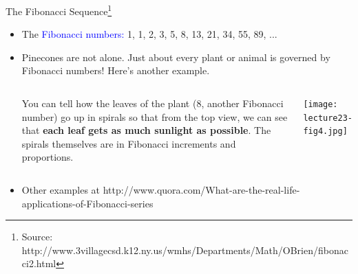 \documentclass[aspectratio=169]{beamer}
\providecommand{\Blue}[1]{\textcolor{blue}{#1}}
\begin{document}
\begin{frame}[plain]{The Fibonacci Sequence\footnote{Source: 
  http://www.3villagecsd.k12.ny.us/wmhs/Departments/Math/OBrien/fibonacci2.html}}
 \begin{itemize}
   \item  The \Blue{Fibonacci numbers:} 1, 1, 2, 3, 5, 8, 13, 21, 34, 55, 89, ...
  \item Pinecones are not alone. Just about every plant or animal is governed by 
    Fibonacci numbers! Here's another example.
    \begin{columns}[c]
        You can tell how the leaves of the plant (8, another Fibonacci number) go up in spirals so that 
      from the top view, we can see that 
      {\bf each leaf gets as much sunlight as possible}. The spirals themselves are 
      in Fibonacci increments and proportions.
	\begin{center}
	      \texttt{[image: lecture23-fig4.jpg]}
	  \end{center}  
   \end{columns}
   \item Other examples at 
   http://www.quora.com/What-are-the-real-life-applications-of-Fibonacci-series
 \end{itemize}

\end{frame}

\fi


  
 
\end{document}
